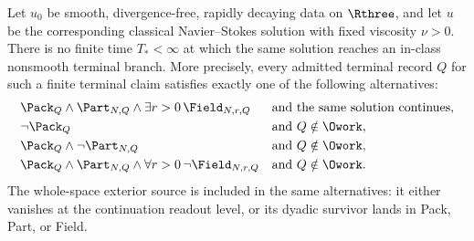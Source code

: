 \begin{theorem}
Let \(u_0\) be smooth, divergence-free, rapidly decaying data on \(\Rthree\), and let \(u\) be the corresponding classical Navier--Stokes solution with fixed viscosity \(\nu>0\).
There is no finite time \(T_*<\infty\) at which the same solution reaches an in-class nonsmooth terminal branch.
More precisely, every admitted terminal record \(Q\) for such a finite terminal claim satisfies exactly one of the following alternatives:
\[
\begin{aligned}
&\Pack_Q\wedge\Part_{N,Q}\wedge \exists r>0\,\Field_{N,r,Q}
&&\text{and the same solution continues,}\\
&\neg\Pack_Q
&&\text{and }Q\notin\Owork,\\
&\Pack_Q\wedge\neg\Part_{N,Q}
&&\text{and }Q\notin\Owork,\\
&\Pack_Q\wedge\Part_{N,Q}\wedge\forall r>0\,\neg\Field_{N,r,Q}
&&\text{and }Q\notin\Owork .
\end{aligned}
\]
The whole-space exterior source is included in the same alternatives: it either vanishes at the continuation readout level, or its dyadic survivor lands in Pack, Part, or Field.
\end{theorem}

